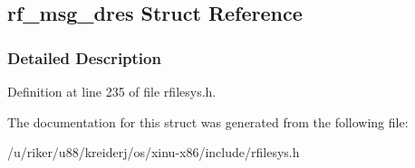 \hypertarget{structrf__msg__dres}{}\subsection{rf\+\_\+msg\+\_\+dres Struct Reference}
\label{structrf__msg__dres}


\subsubsection{Detailed Description}


Definition at line 235 of file rfilesys.\+h.



The documentation for this struct was generated from the following file\+:\begin{DoxyCompactItemize}
\item 
/u/riker/u88/kreiderj/os/xinu-\/x86/include/rfilesys.\+h\end{DoxyCompactItemize}
